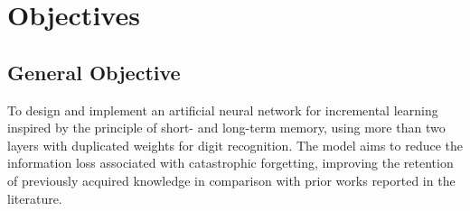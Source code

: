 \section{Objectives}

    \subsection{General Objective}
        To design and implement an artificial neural network for incremental learning inspired by the principle of short- and long-term memory, using more than two layers with duplicated weights for digit recognition. 
        The model aims to reduce the information loss associated with catastrophic forgetting, improving the retention of previously acquired knowledge in comparison with prior works reported in the literature.

